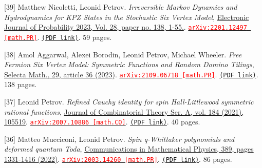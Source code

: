 \begin{etaremune}
\item[{[39]}] 
Matthew Nicoletti, Leonid Petrov.
\emph{Irreversible Markov Dynamics and Hydrodynamics for KPZ States in the Stochastic Six Vertex Model}, \href{https://dx.doi.org/10.1214/23-EJP1005}{Electronic Journal of Probability 2023, Vol. 28, paper no. 138, 1-55.}. 
\href{https://arxiv.org/abs/2201.12497}{\texttt{{\textcolor{red}{arXiv:2201.12497 [math.PR]}}}}. \href{https://storage.lpetrov.cc/papers/39-irreversible_markov_dynamics.pdf}{\texttt{(PDF link)}}. 59 pages.











\item[{[38]}] 
Amol Aggarwal, Alexei Borodin, Leonid Petrov, Michael Wheeler.
\emph{Free Fermion Six Vertex Model: Symmetric Functions and Random Domino Tilings}, \href{https://doi.org/10.1007/s00029-023-00837-y}{Selecta Math., 29, article 36 (2023)}. 
\href{https://arxiv.org/abs/2109.06718}{\texttt{{\textcolor{red}{arXiv:2109.06718 [math.PR]}}}}. \href{https://storage.lpetrov.cc/papers/38-free_fermion_six.pdf}{\texttt{(PDF link)}}. 138 pages.

















\item[{[37]}] 
Leonid Petrov.
\emph{Refined Cauchy identity for spin Hall-Littlewood symmetric rational functions}, \href{https://doi.org/10.1016/j.jcta.2021.105519}{Journal of Combinatorial Theory Ser. A, vol. 184 (2021), 105519}. 
\href{https://arxiv.org/abs/2007.10886}{\texttt{{\textcolor{red}{arXiv:2007.10886 [math.CO]}}}}. \href{https://storage.lpetrov.cc/papers/37-refined_cauchy_identity.pdf}{\texttt{(PDF link)}}. 40 pages.







\item[{[36]}] 
Matteo Mucciconi, Leonid Petrov.
\emph{Spin q-Whittaker polynomials and deformed quantum Toda}, \href{https://doi.org/10.1007/s00220-021-04279-5}{Communications in Mathematical Physics, 389, pages 1331-1416 (2022)}. 
\href{https://arxiv.org/abs/2003.14260}{\texttt{{\textcolor{red}{arXiv:2003.14260 [math.PR]}}}}. \href{https://storage.lpetrov.cc/papers/36-spin_qwhittaker_polynomials.pdf}{\texttt{(PDF link)}}. 86 pages.










\end{etaremune}
